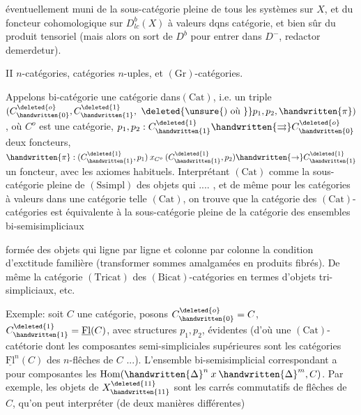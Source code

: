 
éventuellement muni de la sous-catégorie pleine de tous les systèmes  sur $X$, et du foncteur cohomologique sur $D^b_{lc}(X)$ à valeurs dqns  catégorie, et bien sûr du produit tensoriel (mais alors on sort de $D^b$ pour entrer dans $D^-$, redactor demerdetur).

II \quad $n$-catégories, catégories $n$-uples, et $(\mathrm{Gr})$-catégories.

Appelons bi-catégorie une catégorie dans$(\mathrm{Cat})$, i.e. un triple $(C^{\deleted{o}}_{\handwritten{0}},C^{\deleted{1}}_{\handwritten{1}},\ \deleted{\unsure{)\text{ où }}}p_1,p_2,\handwritten{\pi})$, où $C^o$ est une catégorie, $p_1,p_2:C^{\deleted{1}}_{\handwritten{1}}\handwritten{\rightrightarrows}C^{\deleted{o}}_{\handwritten{0}}$ deux foncteurs, $\handwritten{\pi}:(C^{\deleted{1}}_{\handwritten{1}},p_1)\mathbin{x}_{C^o}(C^{\deleted{1}}_{\handwritten{1}},p_2)\handwritten{\to}C^{\deleted{1}}_{\handwritten{1}}$ un foncteur, avec les axiomes habituels. Interprétant $(\mathrm{Cat})$ comme la sous-catégorie pleine de $(\mathrm{Ssimpl})$ des objets qui .... , et de même pour les catégories à valeurs dans une catégorie telle $(\mathrm{Cat})$, on trouve que la catégorie  des $(\mathrm{Cat})$-catégories est équivalente à la sous-catégorie pleine de la catégorie des ensembles bi-semisimpliciaux


formée des objets qui ligne par ligne et colonne par colonne  la condition d'exctitude familière (transformer sommes amalgamées en produits fibrés). De même la catégorie  $(\mathrm{Tricat})$ des $(\mathrm{Bicat})$-catégories  en termes d'objets tri-simpliciaux, etc.

Exemple: soit $C$ une catégorie, posons $C^{\deleted{o}}_{\handwritten{0}}=C$, $C^{\deleted{1}}_{\handwritten{1}}=\underline{\mathrm{Fl}}(C)$, avec structures $p_1,p_2$, évidentes (d'où une $(\mathrm{Cat})$-catétorie dont les composantes semi-simpliciales supérieures sont les catégories $\underline{\mathrm{Fl}}^n(C)$ des $n$-flêches de $C$ ...). L'ensemble bi-semisimplicial correspondant a pour composantes les  $\mathrm{Hom}(\handwritten{\Delta}^n\mathbin{x}\handwritten{\Delta}^m,C)$. Par exemple, les objets de $X^{\deleted{11}}_{\handwritten{11}}$ sont les carrés commutatifs de flêches de $C$, qu'on peut interpréter (de deux manières différentes) 


